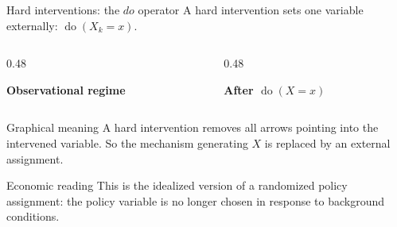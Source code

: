 \documentclass[dvipsnames,aspectratio=169,handout]{beamer}
\begin{document}
\begin{frame}{Hard interventions: the \texorpdfstring{$do$}{do} operator}
A hard intervention sets one variable externally:\qquad
$
\operatorname{do}(X_k=x).
$

\begin{columns}[T]
\begin{column}{0.48\textwidth}
\begin{center}
\textbf{Observational regime}

\end{center}
\end{column}

\begin{column}{0.48\textwidth}
\begin{center}
\textbf{After $\operatorname{do}(X=x)$}

\end{center}
\end{column}
\end{columns}

\begin{alertblock}{Graphical meaning}
A hard intervention removes all arrows pointing into the intervened variable.
So the mechanism generating $X$ is replaced by an external assignment.
\end{alertblock}

\begin{block}{Economic reading}
This is the idealized version of a randomized policy assignment:
the policy variable is no longer chosen in response to background conditions.
\end{block}
\end{frame}
\end{document}
